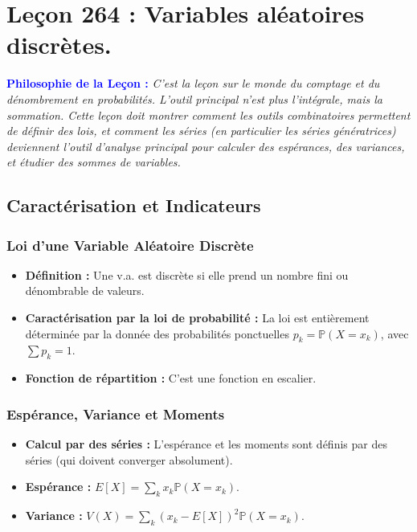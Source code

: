 \documentclass[12pt, a4paper, parskip=full]{report}
\theoremstyle{agregstyle}
\newenvironment{philosophie}
  {\par\medskip\noindent\begin{oframed}\noindent\textbf{\textcolor{blue}{Philosophie de la Leçon :}}\itshape}
  {\end{oframed}\par\medskip}
\begin{document}
\chapter{Leçon 264 : Variables aléatoires discrètes.}

\begin{philosophie}
    C'est la leçon sur le monde du comptage et du dénombrement en probabilités. L'outil principal n'est plus l'intégrale, mais la sommation. Cette leçon doit montrer comment les outils combinatoires permettent de définir des lois, et comment les séries (en particulier les séries génératrices) deviennent l'outil d'analyse principal pour calculer des espérances, des variances, et étudier des sommes de variables.
\end{philosophie}

\section{Caractérisation et Indicateurs}
\subsection{Loi d'une Variable Aléatoire Discrète}
\begin{itemize}
    \item \textbf{Définition :} Une v.a. est discrète si elle prend un nombre fini ou dénombrable de valeurs.
    \item \textbf{Caractérisation par la loi de probabilité :} La loi est entièrement déterminée par la donnée des probabilités ponctuelles $p_k = \mathbb{P}(X=x_k)$, avec $\sum p_k = 1$.
    \item \textbf{Fonction de répartition :} C'est une fonction en escalier.
\end{itemize}
\subsection{Espérance, Variance et Moments}
\begin{itemize}
    \item \textbf{Calcul par des séries :} L'espérance et les moments sont définis par des séries (qui doivent converger absolument).
    \item \textbf{Espérance :} $E[X] = \sum_k x_k \mathbb{P}(X=x_k)$.
    \item \textbf{Variance :} $V(X) = \sum_k (x_k - E[X])^2 \mathbb{P}(X=x_k)$.
\end{itemize}
\end{document}
